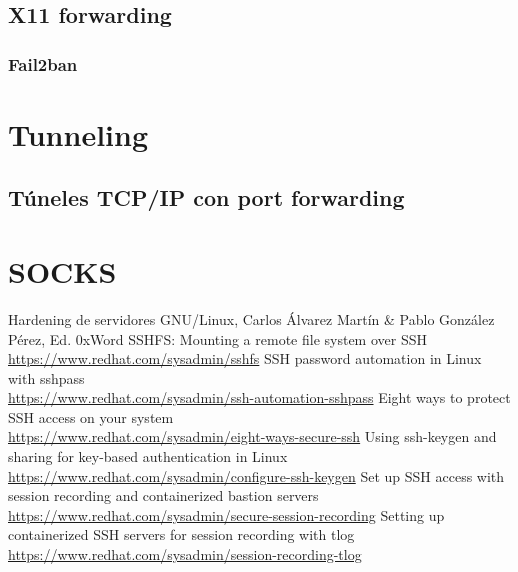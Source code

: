 \documentclass[a4paper, 11pt, titlepage]{article}
\begin{document}
    \subsection{X11 forwarding}
    \subsubsection{Fail2ban}
\section{Tunneling}
    \subsection{Túneles TCP/IP con port forwarding}
\section{SOCKS}

\newpage
\begin{thebibliography}{X}
    \bibitem{} Hardening de servidores GNU/Linux, Carlos Álvarez Martín \& Pablo González Pérez, Ed. 0xWord
    \bibitem{} SSHFS: Mounting a remote file system over SSH \\ \url{https://www.redhat.com/sysadmin/sshfs}
    \bibitem{} SSH password automation in Linux with sshpass \\ \url{https://www.redhat.com/sysadmin/ssh-automation-sshpass}
    \bibitem{} Eight ways to protect SSH access on your system \\ \url{https://www.redhat.com/sysadmin/eight-ways-secure-ssh}
    \bibitem{} Using ssh-keygen and sharing for key-based authentication in Linux \\ \url{https://www.redhat.com/sysadmin/configure-ssh-keygen}
    \bibitem{} Set up SSH access with session recording and containerized bastion servers \\ \url{https://www.redhat.com/sysadmin/secure-session-recording}
    \bibitem{} Setting up containerized SSH servers for session recording with tlog \\ \url{https://www.redhat.com/sysadmin/session-recording-tlog}
\end{thebibliography}
\end{document}
